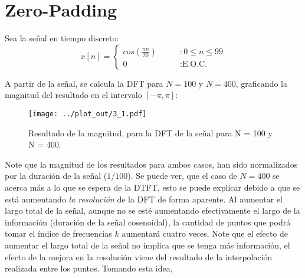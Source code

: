 \section{Zero-Padding}
	Sea la señal en tiempo discreto:
	\begin{equation}
				x[n] = \begin{cases}
							cos\left( \frac{\pi n}{20} \right)  & \qquad : 0 \leq n \leq 99 \\
							0  & \qquad : \text{E.O.C.}
						\end{cases}
	\end{equation}
	
	A partir de la señal, se calcula la DFT para $N = 100$ y $N = 400$, graficando la magnitud del resultado en el intervalo $\left[ -\pi , \pi \right]$:
	\begin{figure}[H]
		\center
		\texttt{[image: ../plot\_out/3\_1.pdf]}
		\caption{Resultado de la magnitud, para la DFT de la señal para N = 100 y N = 400. }
		\label{fig:3_1_mag_plot}
	\end{figure}
	
	Note que la magnitud de los resultados para ambos casos, han sido normalizados por la duración de la señal ($1/100$). Se puede ver, que el caso de $N = 400$ se acerca más a lo que se espera de la \textsc{DTFT}, esto se puede explicar debido a que se está aumentando \textit{la resolución} de la \textsc{DFT} de forma aparente. Al aumentar el largo total de la señal, aunque no se esté aumentando efectivamente el largo de la información (duración de la señal cosenoidal), la cantidad de puntos que podrá tomar el índice de frecuencias $k$ aumentará cuatro veces. Note que el efecto de aumentar el largo total de la señal no implica que se tenga más información, el efecto de la mejora en la resolución viene del resultado de la interpolación realizada entre los puntos. Tomando esta idea, 
